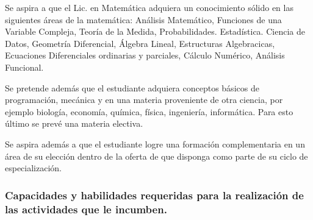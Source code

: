 \documentclass[a4paper, 12pt]{article}
\begin{document}
Se aspira a que el Lic. en Matemática adquiera un conocimiento sólido en las siguientes  áreas de
 la matemática: Análisis Matemático, Funciones de una Variable Compleja,   Teoría de la Medida, Probabilidades. Estadística. Ciencia de Datos, Geometría Diferencial, Álgebra Lineal, Estructuras Algebracicas, Ecuaciones Diferenciales ordinarias y parciales, Cálculo Numérico, Análisis Funcional.
 
 Se pretende además que el estudiante adquiera conceptos básicos de programación, mecánica y en una materia proveniente de otra ciencia, por ejemplo biología, economía, química, física, ingeniería, informática. Para esto último se prevé una  materia electiva. 

 Se aspira además a que el estudiante logre una formación complementaria en un área de su elección dentro de la oferta de que disponga como parte de su ciclo de especialización.
 
\subsubsection{Capacidades y habilidades requeridas para la realización de las actividades que le incumben.}
\end{document}
